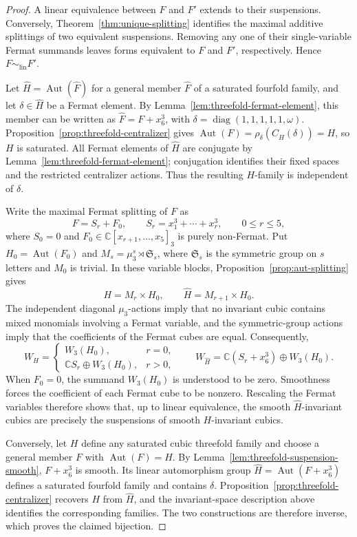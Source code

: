 \documentclass[12pt]{amsart}
\numberwithin{equation}{section}
\theoremstyle{plain}
\theoremstyle{definition}
\theoremstyle{remark}
\newcommand{\CC}{\mathbb C}
\DeclareMathOperator{\Aut}{Aut}
\DeclareMathOperator{\diag}{diag}
\begin{document}
\begin{proof}
A linear equivalence between \(F\) and \(F'\) extends to their suspensions.
Conversely, Theorem~\ref{thm:unique-splitting} identifies the maximal
additive splittings of two equivalent suspensions.  Removing any one of
their single-variable Fermat summands leaves forms equivalent to \(F\) and \(F'\),
respectively.  Hence \(F\sim_{\mathrm{lin}}F'\).

Let \(\widehat H=\Aut(\widehat F)\) for a general member \(\widehat F\) of a
saturated fourfold family, and let \(\delta\in\widehat H\) be a Fermat element.  By
Lemma~\ref{lem:threefold-fermat-element}, this member can be written
as \(\widehat F=F+x_6^3\), with
\(\delta=\diag(1,1,1,1,1,\omega)\).
Proposition~\ref{prop:threefold-centralizer} gives
\(\Aut(F)=\rho_\delta(C_{\widehat H}(\delta))=H\), so \(H\) is
saturated.  All Fermat elements of \(\widehat H\) are conjugate by
Lemma~\ref{lem:threefold-fermat-element}; conjugation identifies their
fixed spaces and the restricted centralizer actions.  Thus the resulting
\(H\)-family is independent of \(\delta\).

Write the maximal Fermat splitting of \(F\) as
\[
 F=S_r+F_0,\qquad S_r=x_1^3+\cdots+x_r^3,\qquad 0\le r\le5,
\]
where \(S_0=0\) and \(F_0\in\CC[x_{r+1},\ldots,x_5]_3\) is purely non-Fermat.
Put \(H_0=\Aut(F_0)\) and
\(M_s=\mu_3^s\rtimes\mathfrak S_s\), where \(\mathfrak S_s\) is the symmetric
group on \(s\) letters and \(M_0\) is trivial.  In these variable
blocks, Proposition~\ref{prop:aut-splitting} gives
\[
 H=M_r\times H_0,\qquad \widehat H=M_{r+1}\times H_0.
\]
The independent diagonal \(\mu_3\)-actions imply that no invariant cubic
contains mixed monomials involving a Fermat variable, and the
symmetric-group actions imply that the coefficients of the Fermat cubes
are equal. Consequently,
\[
 W_H=
 \begin{cases}
 W_3(H_0),&r=0,\\
 \CC S_r\oplus W_3(H_0),&r>0,
 \end{cases}
 \qquad
 W_{\widehat H}=\CC(S_r+x_6^3)\oplus W_3(H_0).
\]
When \(F_0=0\), the summand \(W_3(H_0)\) is understood to be zero.
Smoothness forces the coefficient of each Fermat cube to be nonzero.
Rescaling the Fermat variables therefore shows that, up to linear
equivalence, the smooth \(\widehat H\)-invariant cubics are precisely the
suspensions of smooth \(H\)-invariant cubics.

Conversely, let \(H\) define any saturated cubic threefold family and
choose a general member \(F\) with \(\Aut(F)=H\).  By
Lemma~\ref{lem:threefold-suspension-smooth}, \(F+x_6^3\) is smooth.
Its linear automorphism group \(\widehat H=\Aut(F+x_6^3)\) defines a saturated
fourfold family and contains \(\delta\).
Proposition~\ref{prop:threefold-centralizer} recovers \(H\) from
\(\widehat H\), and the invariant-space description above identifies
the corresponding families.  The two constructions are therefore inverse,
which proves the claimed bijection.


\end{proof}
\end{document}
